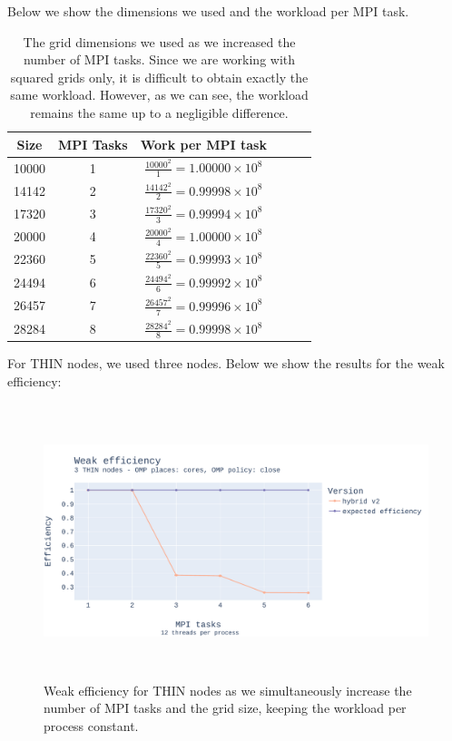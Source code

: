 \documentclass{report}
\begin{document}
Below we show the dimensions we used and the workload per MPI task.

\begin{table}[H]
\centering
\begin{tabular}{|c|c|c|c|c|c|}
    \hline
    Size & MPI Tasks & Work per MPI task \\\hline
    10000 &    1     & $\frac{10000^2}{1}=1.00000\times 10^8$ \\
    14142 &    2     & $\frac{14142^2}{2}=0.99998\times 10^8$\\
    17320 &    3     & $\frac{17320^2}{3}=0.99994\times 10^8$ \\
    20000 &    4     & $\frac{20000^2}{4}=1.00000\times 10^8$\\
    22360 &    5     & $\frac{22360^2}{5}=0.99993\times 10^8$\\
    24494 &    6     & $\frac{24494^2}{6}=0.99992\times 10^8$\\
    26457 &    7     & $\frac{26457^2}{7}=0.99996\times 10^8$\\
    28284 &    8     & $\frac{28284^2}{8}=0.99998\times 10^8$\\ \hline
\end{tabular}
\caption{\label{tab:weak}The grid dimensions we used as we increased the number 
of MPI tasks. Since we are working with squared grids only, it is difficult to 
obtain exactly the same workload. However, as we can see, the workload remains 
the same up to a negligible difference.}
\end{table}

For THIN nodes, we used three nodes. Below we show the results for the 
weak efficiency:

\begin{figure}[H]
\centering
\includegraphics[width=14cm, height=8cm]{./images/weak_MPI_thin_hybrid.pdf}
\caption{\label{fig:weakmpithinhybrid} Weak efficiency for THIN nodes as 
we simultaneously increase the number of MPI tasks and the grid size, keeping the 
workload per process constant.}
\end{figure}
\end{document}
